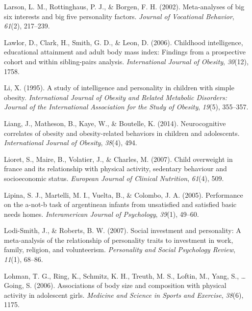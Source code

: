 \documentclass[man]{apa6}
\begin{document}
\leavevmode\hypertarget{ref-larson2002meta}{}%
Larson, L. M., Rottinghaus, P. J., \& Borgen, F. H. (2002). Meta-analyses of big six interests and big five personality factors. \emph{Journal of Vocational Behavior}, \emph{61}(2), 217--239.

\leavevmode\hypertarget{ref-lawlor2006childhood}{}%
Lawlor, D., Clark, H., Smith, G. D., \& Leon, D. (2006). Childhood intelligence, educational attainment and adult body mass index: Findings from a prospective cohort and within sibling-pairs analysis. \emph{International Journal of Obesity}, \emph{30}(12), 1758.

\leavevmode\hypertarget{ref-li1995study}{}%
Li, X. (1995). A study of intelligence and personality in children with simple obesity. \emph{International Journal of Obesity and Related Metabolic Disorders: Journal of the International Association for the Study of Obesity}, \emph{19}(5), 355--357.

\leavevmode\hypertarget{ref-liang2014neurocognitive}{}%
Liang, J., Matheson, B., Kaye, W., \& Boutelle, K. (2014). Neurocognitive correlates of obesity and obesity-related behaviors in children and adolescents. \emph{International Journal of Obesity}, \emph{38}(4), 494.

\leavevmode\hypertarget{ref-lioret2007child}{}%
Lioret, S., Maire, B., Volatier, J., \& Charles, M. (2007). Child overweight in france and its relationship with physical activity, sedentary behaviour and socioeconomic status. \emph{European Journal of Clinical Nutrition}, \emph{61}(4), 509.

\leavevmode\hypertarget{ref-lipina2005performance}{}%
Lipina, S. J., Martelli, M. I., Vuelta, B., \& Colombo, J. A. (2005). Performance on the a-not-b task of argentinean infants from unsatisfied and satisfied basic needs homes. \emph{Interamerican Journal of Psychology}, \emph{39}(1), 49--60.

\leavevmode\hypertarget{ref-lodi2007social}{}%
Lodi-Smith, J., \& Roberts, B. W. (2007). Social investment and personality: A meta-analysis of the relationship of personality traits to investment in work, family, religion, and volunteerism. \emph{Personality and Social Psychology Review}, \emph{11}(1), 68--86.

\leavevmode\hypertarget{ref-lohman2006associations}{}%
Lohman, T. G., Ring, K., Schmitz, K. H., Treuth, M. S., Loftin, M., Yang, S., \ldots{} Going, S. (2006). Associations of body size and composition with physical activity in adolescent girls. \emph{Medicine and Science in Sports and Exercise}, \emph{38}(6), 1175.
\end{document}
